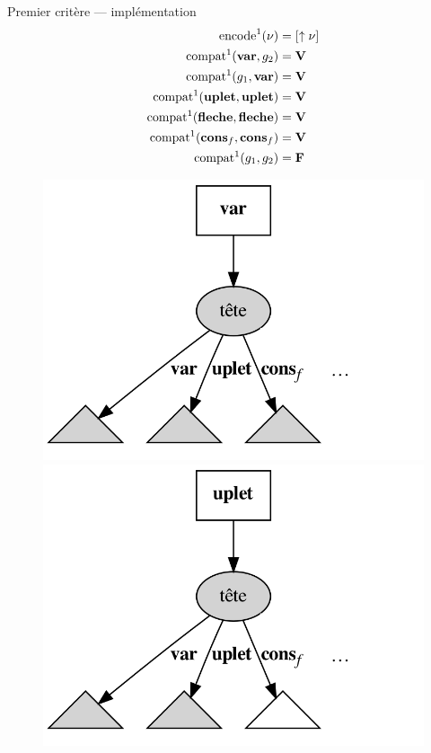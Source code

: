 \documentclass[serif]{beamer}
\begin{document}
\begin{frame}{Premier critère — implémentation}
\footnotesize
\begin{align*}
		\mathrm{encode}^1 (\nu) &=
		[ \uparrow \nu ]
	\\
		\mathrm{compat}^1 (\bold{var}, {g}_2) &=
		\bold{V}
	\\
		\mathrm{compat}^1 ({g}_1, \bold{var}) &=
		\bold{V}
	\\
		\mathrm{compat}^1 (\bold{uplet}, \bold{uplet}) &=
		\bold{V}
	\\
		\mathrm{compat}^1 (\bold{fleche}, \bold{fleche}) &=
		\bold{V}
	\\
		\mathrm{compat}^1 (\bold{cons}_f, \bold{cons}_f) &=
		\bold{V}
	\\
		\mathrm{compat}^1 ({g}_1, {g}_2) &=
		\bold{F}
\end{align*}
\begin{figure}[h]
	\centering
	\includegraphics[scale=0.12]{graphs/crit1_1}
	\includegraphics[scale=0.12]{graphs/crit1_2}

\end{figure}
\end{frame}
\end{document}
